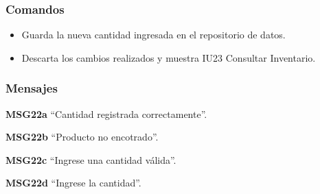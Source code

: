 \subsubsection{Comandos}
\begin{itemize}
	\item {} Guarda la nueva cantidad ingresada en el repositorio de datos.
	\item {} Descarta los cambios realizados y muestra IU23 Consultar Inventario.
\end{itemize}

\subsubsection{Mensajes}
\begin{Citemize}
	\item {\bf MSG22a} ``Cantidad registrada correctamente''.
	\item {\bf MSG22b} ``Producto no encotrado''.
	\item {\bf MSG22c} ``Ingrese una cantidad válida''.
	\item {\bf MSG22d} ``Ingrese la cantidad''.
\end{Citemize}
